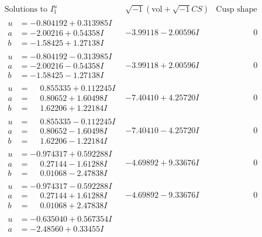 \documentclass[1p]{elsarticle_modified}
\theoremstyle{definition}
\newcommand{\I}{\sqrt{-1}}
\begin{document}
$$\begin{array}{c|c|c}
\text{Solutions to }I^u_{1}& \I (\text{vol} + \sqrt{-1}CS) & \text{Cusp shape}\\
 \hline 
\begin{aligned}
u &= -0.804192 + 0.313985 I \\
a &= -2.00216 + 0.54358 I \\
b &= -1.58425 + 1.27138 I\end{aligned}
 & -3.99118 - 2.00596 I & \phantom{-0.000000 } 0 \\ \hline\begin{aligned}
u &= -0.804192 - 0.313985 I \\
a &= -2.00216 - 0.54358 I \\
b &= -1.58425 - 1.27138 I\end{aligned}
 & -3.99118 + 2.00596 I & \phantom{-0.000000 } 0 \\ \hline\begin{aligned}
u &= \phantom{-}0.855335 + 0.112245 I \\
a &= \phantom{-}0.80652 + 1.60498 I \\
b &= \phantom{-}1.62206 + 1.22184 I\end{aligned}
 & -7.40410 + 4.25720 I & \phantom{-0.000000 } 0 \\ \hline\begin{aligned}
u &= \phantom{-}0.855335 - 0.112245 I \\
a &= \phantom{-}0.80652 - 1.60498 I \\
b &= \phantom{-}1.62206 - 1.22184 I\end{aligned}
 & -7.40410 - 4.25720 I & \phantom{-0.000000 } 0 \\ \hline\begin{aligned}
u &= -0.974317 + 0.592288 I \\
a &= \phantom{-}0.27144 - 1.61288 I \\
b &= \phantom{-}0.01068 - 2.47838 I\end{aligned}
 & -4.69892 + 9.33676 I & \phantom{-0.000000 } 0 \\ \hline\begin{aligned}
u &= -0.974317 - 0.592288 I \\
a &= \phantom{-}0.27144 + 1.61288 I \\
b &= \phantom{-}0.01068 + 2.47838 I\end{aligned}
 & -4.69892 - 9.33676 I & \phantom{-0.000000 } 0 \\ \hline\begin{aligned}
u &= -0.635040 + 0.567354 I \\
a &= -2.48560 + 0.33455 I \\

\end{aligned}
\end{array}$$
\end{document}
